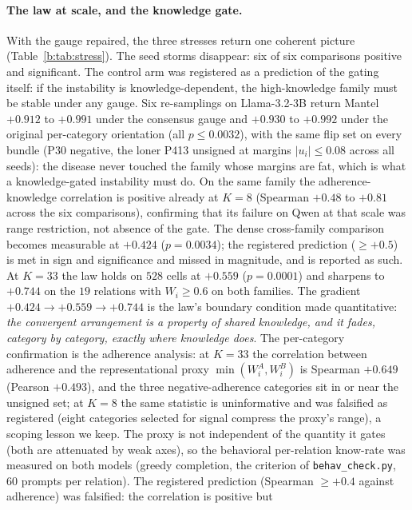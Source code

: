 \documentclass[11pt]{article}
\begin{document}
\paragraph{The law at scale, and the knowledge gate.} With the gauge
repaired, the three stresses return one coherent picture
(Table~\ref{b:tab:stress}). The seed storms disappear: six of six
comparisons positive and significant. The control arm was registered as
a prediction of the gating itself: if the instability is
knowledge-dependent, the high-knowledge family must be stable under any
gauge. Six re-samplings on Llama-3.2-3B return Mantel $+0.912$ to
$+0.991$ under the consensus gauge and $+0.930$ to $+0.992$ under the
original per-category orientation (all $p \leq 0.0032$), with the same
flip set on every bundle
(P30 negative, the loner P413 unsigned at margins $|u_i| \leq 0.08$
across all seeds): the disease never touched the family whose margins
are fat, which is what a knowledge-gated instability must do. On the
same family the adherence-knowledge correlation is positive already at
$K{=}8$ (Spearman $+0.48$ to $+0.81$ across the six comparisons),
confirming that its failure on Qwen at that scale was range
restriction, not absence of the gate. The dense cross-family comparison
becomes measurable at $+0.424$ ($p = 0.0034$); the registered prediction
($\geq +0.5$) is met in sign and significance and missed in magnitude, and
is reported as such. At $K{=}33$ the law holds on $528$ cells at $+0.559$
($p = 0.0001$) and sharpens to $+0.744$ on the $19$ relations with
$W_i \geq 0.6$ on both families. The gradient $+0.424 \to +0.559 \to
+0.744$ is the law's boundary condition made quantitative: \emph{the
convergent arrangement is a property of shared knowledge, and it fades,
category by category, exactly where knowledge does}. The per-category
confirmation is the adherence analysis: at $K{=}33$ the correlation
between adherence and the representational proxy $\min(W_i^{A}, W_i^{B})$
is Spearman $+0.649$ (Pearson $+0.493$), and the three negative-adherence
categories sit in or near the unsigned set; at $K{=}8$ the same statistic
is uninformative and was falsified as registered (eight categories
selected for signal compress the proxy's range), a scoping lesson we keep.
The proxy is not independent of the quantity it gates (both are attenuated
by weak axes), so the behavioral per-relation know-rate was measured on
both models (greedy completion, the criterion of \texttt{behav\_check.py},
$60$ prompts per relation). The registered prediction (Spearman $\geq
+0.4$ against adherence) was falsified: the correlation is positive but
\end{document}
